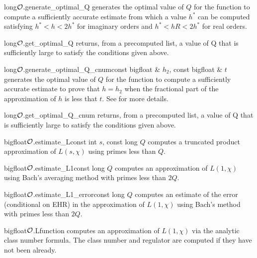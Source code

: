 \begin{fcode}{long}{$\mathcal{O}$.generate_optimal_Q}{}
  generates the optimal value of $Q$ for the function  to compute a
  sufficiently accurate estimate from which a value $h^*$ can be computed satisfying $h^* < h <
  2h^*$ for imaginary orders and $h^* < hR < 2h^*$ for real orders.
\end{fcode}

\begin{fcode}{long}{$\mathcal{O}$.get_optimal_Q}{}
  returns, from a precomputed list, a value of Q that is sufficiently large to satisfy the
  conditions given above.
\end{fcode}

\begin{fcode}{long}{$\mathcal{O}$.generate_optimal_Q_cnum}{const bigfloat & $h_2$, const bigfloat & $t$}
  generates the optimal value of $Q$ for the function  to compute a
  sufficiently accurate estimate to prove that $h = h_2$ when the fractional part of the
  approximation of $h$ is less that $t$.  See \cite{Mollin/Williams:1992} for more details.
\end{fcode}

\begin{fcode}{long}{$\mathcal{O}$.get_optimal_Q_cnum}{}
  returns, from a precomputed list, a value of Q that is sufficiently large to satisfy the
  conditions given above.
\end{fcode}

\begin{fcode}{bigfloat}{$\mathcal{O}$.estimate_L}{const int $s$, const long $Q$}
  computes a truncated product approximation of $L(s, \chi)$ using primes less than $Q$.
\end{fcode}

\begin{fcode}{bigfloat}{$\mathcal{O}$.estimate_L1}{const long $Q$}
  computes an approximation of $L(1, \chi)$ using Bach's averaging method \cite{Bach:1995}
  with primes less than $2 Q$.
\end{fcode}

\begin{fcode}{bigfloat}{$\mathcal{O}$.estimate_L1_error}{const long $Q$}
  computes an estimate of the error (conditional on EHR) in the approximation of $L(1, \chi)$
  using Bach's method \cite{Bach:1995} with primes less than $2Q$.
\end{fcode}

\begin{fcode}{bigfloat}{$\mathcal{O}$.Lfunction}{}
  computes an approximation of $L(1, \chi)$ via the analytic class number formula.  The class
  number and regulator are computed if they have not been already.
\end{fcode}

